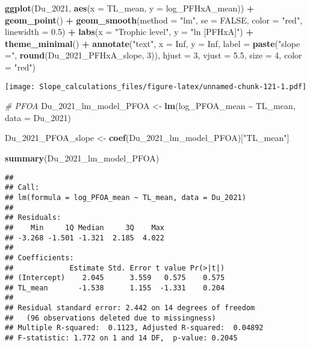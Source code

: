 \documentclass[
]{article}
\newenvironment{Shaded}{\begin{snugshade}}{\end{snugshade}}
\newcommand{\AttributeTok}[1]{\textcolor[rgb]{0.13,0.29,0.53}{#1}}
\newcommand{\CommentTok}[1]{\textcolor[rgb]{0.56,0.35,0.01}{\textit{#1}}}
\newcommand{\ConstantTok}[1]{\textcolor[rgb]{0.56,0.35,0.01}{#1}}
\newcommand{\DecValTok}[1]{\textcolor[rgb]{0.00,0.00,0.81}{#1}}
\newcommand{\FloatTok}[1]{\textcolor[rgb]{0.00,0.00,0.81}{#1}}
\newcommand{\FunctionTok}[1]{\textcolor[rgb]{0.13,0.29,0.53}{\textbf{#1}}}
\newcommand{\NormalTok}[1]{#1}
\newcommand{\OtherTok}[1]{\textcolor[rgb]{0.56,0.35,0.01}{#1}}
\newcommand{\SpecialCharTok}[1]{\textcolor[rgb]{0.81,0.36,0.00}{\textbf{#1}}}
\newcommand{\StringTok}[1]{\textcolor[rgb]{0.31,0.60,0.02}{#1}}
\begin{document}
\begin{Shaded}
\begin{Highlighting}[]
\FunctionTok{ggplot}\NormalTok{(Du\_2021, }\FunctionTok{aes}\NormalTok{(}\AttributeTok{x =}\NormalTok{ TL\_mean, }\AttributeTok{y =}\NormalTok{ log\_PFHxA\_mean)) }\SpecialCharTok{+}
  \FunctionTok{geom\_point}\NormalTok{() }\SpecialCharTok{+}
  \FunctionTok{geom\_smooth}\NormalTok{(}\AttributeTok{method =} \StringTok{"lm"}\NormalTok{, }\AttributeTok{se =} \ConstantTok{FALSE}\NormalTok{, }\AttributeTok{color =} \StringTok{"red"}\NormalTok{, }\AttributeTok{linewidth =} \FloatTok{0.5}\NormalTok{) }\SpecialCharTok{+}
  \FunctionTok{labs}\NormalTok{(}\AttributeTok{x =} \StringTok{"Trophic level"}\NormalTok{,}
       \AttributeTok{y =} \StringTok{"ln [PFHxA]"}\NormalTok{) }\SpecialCharTok{+}
  \FunctionTok{theme\_minimal}\NormalTok{() }\SpecialCharTok{+}
  \FunctionTok{annotate}\NormalTok{(}\StringTok{"text"}\NormalTok{, }\AttributeTok{x =} \ConstantTok{Inf}\NormalTok{, }\AttributeTok{y =} \ConstantTok{Inf}\NormalTok{, }\AttributeTok{label =} \FunctionTok{paste}\NormalTok{(}\StringTok{"slope ="}\NormalTok{, }\FunctionTok{round}\NormalTok{(Du\_2021\_PFHxA\_slope, }\DecValTok{3}\NormalTok{)), }
           \AttributeTok{hjust =} \DecValTok{3}\NormalTok{, }\AttributeTok{vjust =} \FloatTok{5.5}\NormalTok{, }\AttributeTok{size =} \DecValTok{4}\NormalTok{, }\AttributeTok{color =} \StringTok{"red"}\NormalTok{)}
\end{Highlighting}
\end{Shaded}

\texttt{[image: Slope\_calculations\_files/figure-latex/unnamed-chunk-121-1.pdf]}

\begin{Shaded}
\begin{Highlighting}[]
\CommentTok{\# PFOA}
\NormalTok{Du\_2021\_lm\_model\_PFOA }\OtherTok{\textless{}{-}} \FunctionTok{lm}\NormalTok{(log\_PFOA\_mean }\SpecialCharTok{\textasciitilde{}}\NormalTok{ TL\_mean,}
                             \AttributeTok{data =}\NormalTok{ Du\_2021)}

\NormalTok{Du\_2021\_PFOA\_slope }\OtherTok{\textless{}{-}} \FunctionTok{coef}\NormalTok{(Du\_2021\_lm\_model\_PFOA)[}\StringTok{"TL\_mean"}\NormalTok{]}

\FunctionTok{summary}\NormalTok{(Du\_2021\_lm\_model\_PFOA)}
\end{Highlighting}
\end{Shaded}

\begin{verbatim}
## 
## Call:
## lm(formula = log_PFOA_mean ~ TL_mean, data = Du_2021)
## 
## Residuals:
##    Min     1Q Median     3Q    Max 
## -3.268 -1.501 -1.321  2.185  4.022 
## 
## Coefficients:
##             Estimate Std. Error t value Pr(>|t|)
## (Intercept)    2.045      3.559   0.575    0.575
## TL_mean       -1.538      1.155  -1.331    0.204
## 
## Residual standard error: 2.442 on 14 degrees of freedom
##   (96 observations deleted due to missingness)
## Multiple R-squared:  0.1123, Adjusted R-squared:  0.04892 
## F-statistic: 1.772 on 1 and 14 DF,  p-value: 0.2045
\end{verbatim}
\end{document}
